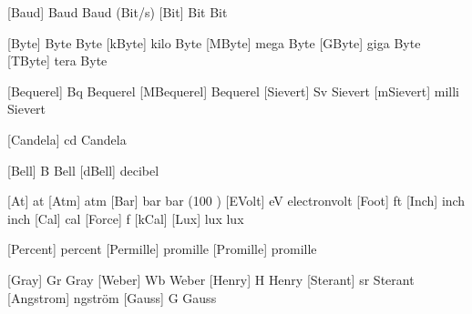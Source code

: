 
 [Baud]  {Baud}        {Baud (Bit/s)}
 [Bit]   {Bit}         {Bit}

 [Byte]  {Byte}        {Byte}
 [kByte] {\Kilo \Byte} {kilo Byte}
 [MByte] {\Mega \Byte} {mega Byte}
 [GByte] {\Giga \Byte} {giga Byte}
 [TByte] {\Tera \Byte} {tera Byte}


 [Bequerel]  {Bq}              {Bequerel}
 [MBequerel] {\Mega \Bequerel} {Bequerel}
 [Sievert]   {Sv}              {Sievert}
 [mSievert]  {\Milli \Sievert} {milli Sievert}


 [Candela] {cd} {Candela}


 [Bell]  {B}           {Bell}
 [dBell] {\Deci \Bell} {decibel}


 [At]    {at}         {}
 [Atm]   {atm}        {}
 [Bar]   {bar}        {bar (100 \Kilo \Pascal)}
 [EVolt] {eV}         {electronvolt}
 [Foot]  {ft}         {}
 [Inch]  {inch}       {inch}
 [Cal]   {cal}        {}
 [Force] {f}          {}
 [kCal]  {\Kilo \Cal} {}
 [Lux]   {lux}        {lux}


\def\xPercent {\dimensionaddfix{\percent }}
\def\xPromille{\dimensionaddfix{\promille}}

 [Percent]  {\xPercent } {percent}
 [Permille] {\xPromille} {promille}
 [Promille] {\xPromille} {promille}


 [Gray]     {Gr}  {Gray}
 [Weber]    {Wb}  {Weber}
 [Henry]    {H}   {Henry}
 [Sterant]  {sr}  {Sterant}
 [Angstrom] {\hbox{\Aring}} {\Aring ngstr\"om}
 [Gauss]    {G}   {Gauss}

